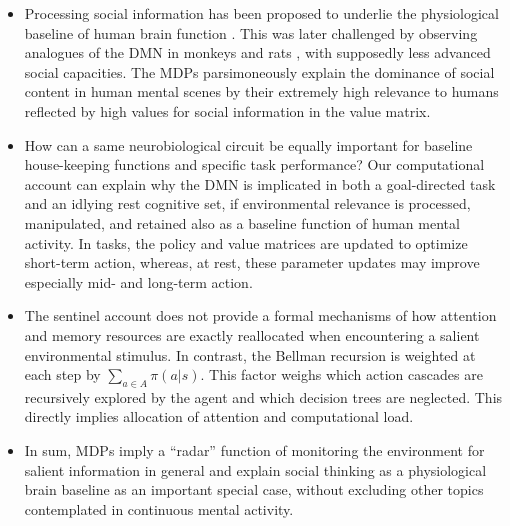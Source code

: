 \documentclass[10pt,letterpaper]{article}
\begin{document}
 \begin{itemize}
    \item Processing social information has been proposed to underlie the
    physiological baseline of human brain function
    \citep{schilbach2008minds}. This was later challenged by observing
    analogues of the DMN in monkeys \citep{mantini2011default}
    and rats \citep{lu2012rat}, with
    supposedly less advanced social capacities.
    The MDPs parsimoneously explain the dominance of social content in
    human mental scenes by their extremely high relevance to humans
    reflected by high values for social information in the value matrix.
    \item How can a same neurobiological circuit be equally important
    for baseline house-keeping functions and specific task performance?
    Our computational account can explain why the DMN is implicated
    in both a goal-directed task and an idlying rest cognitive set,
    if environmental relevance is processed, manipulated, and retained
    also as a baseline function of human mental activity.
    In tasks, the policy and value matrices are updated to optimize short-term action,
    whereas, at rest, these parameter updates may
    improve especially mid- and long-term action.
    \item The sentinel account does not provide a formal mechanisms of
    how attention and memory resources are exactly reallocated when
    encountering a salient environmental stimulus. In contrast,
    the Bellman recursion is weighted at each step by
    $\sum_{a \in A}\pi(a|s)$. This factor weighs which action cascades
    are recursively explored by the agent and which decision trees are neglected.
    This directly implies allocation of attention and computational load.
    \item In sum,
    MDPs imply a ``radar'' function of monitoring the environment for salient information
    in general and explain social thinking as a physiological brain baseline
    as an important special case, without excluding other topics
    contemplated in continuous mental activity.
 \end{itemize}
\end{document}
